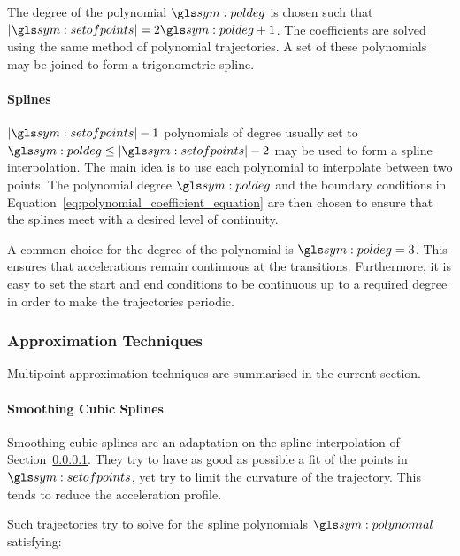 				The degree of the polynomial $\poldeg$ is chosen such that
				$\cardinality{\setofpoints} = 2\poldeg + 1$. The coefficients
				are solved using the same method of polynomial trajectories. A
				set of these polynomials may be joined to form a trigonometric
				spline. %

			\paragraph{Splines}%
			\label{sec:splines}

				$\cardinality{\setofpoints} - 1$ polynomials of degree usually
				set to $\poldeg \leq \cardinality{\setofpoints} - 2$ may be used
				to form a spline interpolation. The main idea is to use each
				polynomial to interpolate between two points. The polynomial
				degree $\poldeg$ and the boundary conditions in
				Equation~\ref{eq:polynomial_coefficient_equation} are then
				chosen to ensure that the splines meet with a desired level of
				continuity.

				A common choice for the degree of the polynomial is $\poldeg =
				3$. This ensures that accelerations remain continuous at the
				transitions. Furthermore, it is easy to set the start and end
				conditions to be continuous up to a required degree in order to
				make the trajectories periodic.

		\subsubsection{Approximation Techniques}%
		\label{sec:approximation_techniques}

			Multipoint approximation techniques are summarised in the current
			section.


			\paragraph{Smoothing Cubic Splines}%
			\label{sec:smoothing_cubic_splines}

				Smoothing cubic splines are an adaptation on the spline
				interpolation of Section~\ref{sec:splines}. They try to have as
				good as possible a fit of the points in $\setofpoints$, yet try
				to limit the curvature of the trajectory. This tends to reduce
				the acceleration profile.

				Such trajectories try to solve for the spline polynomials
				$\polynomial$ satisfying:

